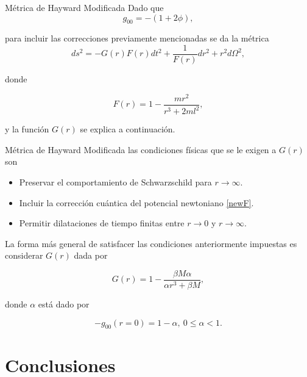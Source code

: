 \documentclass[t]{beamer}
\numberwithin{equation}{section}
\begin{document}
\begin{frame}{Métrica de Hayward Modificada}
Dado que 
\begin{equation}
\label{newton - metric}
g_{00} = - (1 + 2\phi),
\end{equation}

para incluir las correcciones previamente mencionadas se da la métrica
\begin{equation}
\label{reg-schF}
ds^2 = -G(r)F(r) dt^2 + \frac{1}{F(r)} dr^2 + r^2d\Omega^2,
\end{equation}

donde

\begin{equation}
\label{mod-hay-f}
F(r) = 1 - \frac{mr^2}{r^3 + 2ml^2},
\end{equation}

y la función $G(r)$ se explica a continuación.

\end{frame}

\begin{frame}{Métrica de Hayward Modificada}
las condiciones físicas que se le exigen a $G(r)$ son
\begin{itemize}
\item Preservar el comportamiento de Schwarzschild para $r \to \infty$.
\item Incluir la corrección cuántica del potencial newtoniano \eqref{newF}.
\item Permitir dilataciones de tiempo finitas entre $r \to 0$ y $r \to \infty$.
\end{itemize}

La forma más general de satisfacer las condiciones anteriormente impuestas es considerar $G(r)$ dada por

\begin{equation}
\label{mod-hay-g}
G(r) = 1 - \frac{\beta M \alpha}{\alpha r^3 + \beta M},
\end{equation}

donde $\alpha$ está dado por

\begin{equation}
-g_{00}(r = 0) = 1 - \alpha,\ 0 \leq \alpha < 1.
\end{equation}
\end{frame}


\section{\label{conclusions} Conclusiones}
\end{document}
